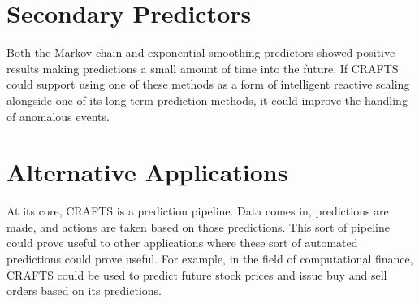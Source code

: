 \section{Secondary Predictors}
Both the Markov chain and exponential smoothing predictors showed positive results making predictions a small amount of time into the future. If CRAFTS could support using one of these methods as a form of intelligent reactive scaling alongside one of its long-term prediction methods, it could improve the handling of anomalous events.

\section{Alternative Applications}
At its core, CRAFTS is a prediction pipeline. Data comes in, predictions are made, and actions are taken based on those predictions. This sort of pipeline could prove useful to other applications where these sort of automated predictions could prove useful. For example, in the field of computational finance, CRAFTS could be used to predict future stock prices and issue buy and sell orders based on its predictions.